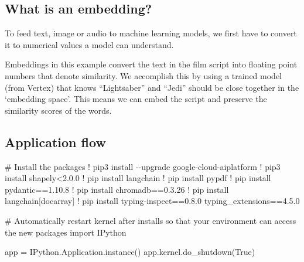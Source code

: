 \documentclass[
  letterpaper,
  DIV=11,
  numbers=noendperiod]{scrreprt}
\newenvironment{Shaded}{\begin{snugshade}}{\end{snugshade}}
\newcommand{\CommentTok}[1]{\textcolor[rgb]{0.37,0.37,0.37}{#1}}
\newcommand{\FloatTok}[1]{\textcolor[rgb]{0.68,0.00,0.00}{#1}}
\newcommand{\ImportTok}[1]{\textcolor[rgb]{0.00,0.46,0.62}{#1}}
\newcommand{\NormalTok}[1]{\textcolor[rgb]{0.00,0.23,0.31}{#1}}
\newcommand{\OperatorTok}[1]{\textcolor[rgb]{0.37,0.37,0.37}{#1}}
\newcommand{\VariableTok}[1]{\textcolor[rgb]{0.07,0.07,0.07}{#1}}
\begin{document}
\hypertarget{what-is-an-embedding}{%
\subsection{What is an embedding?}\label{what-is-an-embedding}}

To feed text, image or audio to machine learning models, we first have
to convert it to numerical values a model can understand.

Embeddings in this example convert the text in the film script into
floating point numbers that denote similarity. We accomplish this by
using a trained model (from Vertex) that knows ``Lightsaber'' and
``Jedi'' should be close together in the `embedding space'. This means
we can embed the script and preserve the similarity scores of the words.

\hypertarget{application-flow}{%
\subsection{Application flow}\label{application-flow}}

\begin{Shaded}
\begin{Highlighting}[]
\CommentTok{\# Install the packages}
\OperatorTok{!}\NormalTok{ pip3 install }\OperatorTok{{-}{-}}\NormalTok{upgrade google}\OperatorTok{{-}}\NormalTok{cloud}\OperatorTok{{-}}\NormalTok{aiplatform}
\OperatorTok{!}\NormalTok{ pip3 install shapely}\OperatorTok{\textless{}}\FloatTok{2.0.0}
\OperatorTok{!}\NormalTok{ pip install langchain}
\OperatorTok{!}\NormalTok{ pip install pypdf}
\OperatorTok{!}\NormalTok{ pip install pydantic}\OperatorTok{==}\FloatTok{1.10.8}
\OperatorTok{!}\NormalTok{ pip install chromadb}\OperatorTok{==}\FloatTok{0.3.26}
\OperatorTok{!}\NormalTok{ pip install langchain[docarray]}
\OperatorTok{!}\NormalTok{ pip install typing}\OperatorTok{{-}}\NormalTok{inspect}\OperatorTok{==}\FloatTok{0.8.0}\NormalTok{ typing\_extensions}\OperatorTok{==}\FloatTok{4.5.0}
\end{Highlighting}
\end{Shaded}

\begin{Shaded}
\begin{Highlighting}[]
\CommentTok{\# Automatically restart kernel after installs so that your environment can access the new packages}
\ImportTok{import}\NormalTok{ IPython}

\NormalTok{app }\OperatorTok{=}\NormalTok{ IPython.Application.instance()}
\NormalTok{app.kernel.do\_shutdown(}\VariableTok{True}\NormalTok{)}
\end{Highlighting}
\end{Shaded}
\end{document}
